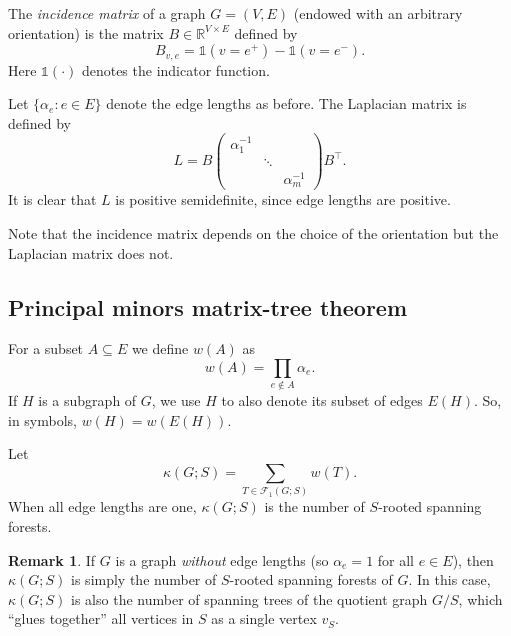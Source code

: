 \documentclass[12pt]{amsart}
\theoremstyle{definition}
\newtheorem{rmk}[thm]{Remark}
\newcommand{\RR}{\mathbb{R}}
\newcommand{\one}{\mathds{1}}
\newcommand{\La}{L}
\newcommand{\tr}{\intercal}
\newcommand{\trees}{\mathcal{F}_1}
\begin{document}
The {\em incidence matrix} of a graph $G = (V,E)$ (endowed with an arbitrary orientation) is the matrix $B \in \RR^{V \times E}$ defined by
\[
	B_{v, e} = \one(v = e^+) - \one(v = e^-).
\]
Here $\one(\cdot)$ denotes the indicator function.

Let $\{ \alpha_e \colon e \in E\}$ denote the edge lengths as before. 
The Laplacian matrix is defined by
\begin{equation}
\label{eq:weighted-laplacian}
	\La = B \begin{pmatrix}
	\alpha_1^{-1} & & \\
	& \ddots & \\
	& & \alpha_m^{-1}
	\end{pmatrix} B^\tr .
\end{equation}
It is clear that $\La$ is positive semidefinite, since edge lengths are positive. 

Note that the incidence matrix depends on the choice of the orientation but the Laplacian matrix does not.


\subsection{Principal minors matrix-tree theorem}

For a subset $A \subseteq E$ we define $w(A)$ as
\[
	w(A) = \prod_{e \not\in A} \alpha_e .
\]
If $H$ is a subgraph of $G$, we use $H$ to also denote its subset of edges $E(H)$. So, in symbols, $w(H) = w\left(E(H)\right)$.

Let 
\[
	\kappa(G;S) = \sum_{T \in \trees(G; S)} w(T) .
\]
When all edge lengths are one, $\kappa(G; S)$ is the number of $S$-rooted spanning forests.

\begin{rmk}
If $G$ is a graph {\em without} edge lengths (so $\alpha_e=1$ for all $e \in E$), then $\kappa(G;S)$ is simply the number of $S$-rooted spanning forests of $G$.
In this case, $\kappa(G;S)$ is also the number of spanning trees of the quotient graph $G / S$, which ``glues together'' all vertices in $S$ as a single vertex $v_S$.
\end{rmk}
\end{document}
